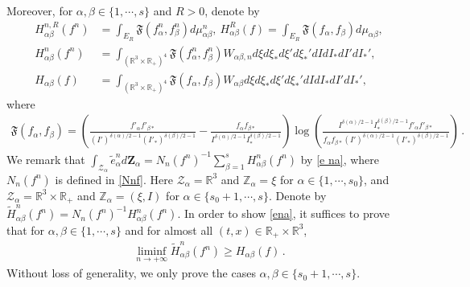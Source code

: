\documentclass[reqno,11pt]{amsart}
\numberwithin{equation}{section}
\def\R{\mathbb{R}}
\begin{document}
Moreover, for $ \alpha , \beta \in \{1,\cdots,s\} $ and $R > 0$, denote by
\begin{equation}\label{HR}
\begin{aligned}
H^{n, R}_{\alpha \beta }(f^n)&= \int_{E_R }  \mathfrak{F} (f_\alpha^n, f_\beta^n) d\mu_{\alpha \beta}^n, \ H_{\alpha \beta }^R (f) = \int_{E_R} \mathfrak{F} (f_\alpha, f_\beta) d\mu_{\alpha \beta} , \\
H_{\alpha \beta }^n (f^n)&= \int_{(\R^3\times \R_+)^4} \mathfrak{F} (f_\alpha^n, f_\beta^n) W_{\alpha \beta, n } d\xi d\xi_* d\xi'd\xi_*'dI dI_* dI'dI_*' , \\
H_{\alpha \beta }(f)&= \int_{(\R^3\times \R_+)^4} \mathfrak{F} (f_\alpha, f_\beta) W_{\alpha \beta } d\xi d\xi_* d\xi'd\xi_*'dI dI_* dI'dI_*' ,
\end{aligned}
\end{equation}
where
\begin{equation*}
  \begin{aligned}
    \mathfrak{F} (f_\alpha, f_\beta) = (\tfrac{{f'_\alpha} {f'_{\beta *}}  } {(I')^{\delta(\alpha)/2-1} (I'_* )^{\delta(\beta)/2-1} }  - \tfrac{f_\alpha f_{\beta * } }{I^{\delta(\alpha)/2-1} I_* ^{\delta(\beta)/2-1} }) \log (\tfrac{I^{\delta(\alpha)/2-1} I_* ^{\delta(\beta)/2-1} {f'_\alpha} {f'_{\beta *}} }{f_\alpha f_{\beta * } (I')^{\delta(\alpha)/2-1} (I'_* )^{\delta(\beta)/2-1} } ) \,.
  \end{aligned}
\end{equation*}
We remark that $ \int_{\mathcal{Z}_\alpha} \tilde{e}_\alpha^n d \mathbf{Z}_\alpha = N_n (f^n)^{-1} \sum_{\beta = 1}^{s} H_{\alpha \beta }^n (f^n) $ by \eqref{e na}, where $ N_n (f^n) $ is defined in \eqref{Nnf}. Here $ \mathcal{Z}_\alpha = \R^3 $ and $\mathbb{Z}_\alpha = \xi$ for $\alpha \in \{ 1, \cdots, s_0 \}$, and $ \mathcal{Z}_\alpha = \R^3 \times \R_+ $ and $\mathbb{Z}_\alpha = ( \xi, I )$ for $\alpha \in \{ s_0 + 1, \cdots, s \}$. Denote by $ \tilde{H}_{\alpha \beta }^n (f^n) = N_n (f^n)^{-1} H_{\alpha \beta }^n (f^n) $. In order to show \eqref{ena}, it suffices to prove that for $\alpha, \beta \in \{ 1, \cdots, s \}$ and for almost all $(t, x) \in \R_+ \times \R^3$,
\begin{equation}\label{HH-limit}
  \begin{aligned}
    \liminf_{n \to + \infty} \tilde{H}_{\alpha \beta }^n (f^n) \geq H_{\alpha \beta }(f) \,.
  \end{aligned}
\end{equation}
Without loss of generality, we only prove the cases $ \alpha , \beta \in \{s_0+1,\cdots,s\}$. 
 
\end{document}
